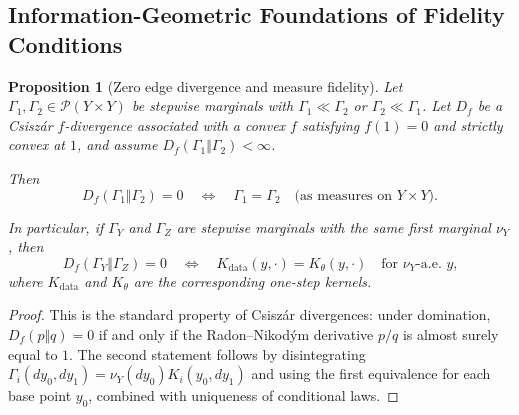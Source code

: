 \documentclass[11pt]{article}
\newtheorem{proposition}{Proposition}
\newcommand{\1}{\mathbf{1}}
\begin{document}

\subsection{Information-Geometric Foundations of Fidelity Conditions}
\label{sec:alpha-stances}

\begin{proposition}[Zero edge divergence and measure fidelity]
\label{prop:zero-div-measure-fidelity}
Let $\Gamma_1, \Gamma_2 \in \mathcal{P}(Y \times Y)$ be stepwise marginals with $\Gamma_1 \ll \Gamma_2$ or $\Gamma_2 \ll \Gamma_1$. Let $D_f$ be a Csisz\'ar $f$-divergence associated with a convex $f$ satisfying $f(1)=0$ and strictly convex at $1$, and assume $D_f(\Gamma_1 \Vert \Gamma_2) < \infty$.

Then
\[
  D_f(\Gamma_1 \Vert \Gamma_2) = 0
  \quad\Longleftrightarrow\quad
  \Gamma_1 = \Gamma_2 \quad \text{(as measures on $Y\times Y$)}.
\]

In particular, if $\Gamma_Y$ and $\Gamma_Z$ are stepwise marginals with the same first marginal $\nu_Y$, then
\[
  D_f(\Gamma_Y \Vert \Gamma_Z) = 0
  \quad\Longleftrightarrow\quad
  K_{\mathrm{data}}(y,\cdot) = K_\theta(y,\cdot)
  \quad \text{for $\nu_Y$-a.e.\ $y$,}
\]
where $K_{\mathrm{data}}$ and $K_\theta$ are the corresponding one-step kernels.
\end{proposition}

\begin{proof}
This is the standard property of Csisz\'ar divergences: under domination, $D_f(p\Vert q) = 0$ if and only if the Radon--Nikod\'ym derivative $p/q$ is almost surely equal to $1$. The second statement follows by disintegrating $\Gamma_i(dy_0,dy_1) = \nu_Y(dy_0) K_i(y_0,dy_1)$ and using the first equivalence for each base point $y_0$, combined with uniqueness of conditional laws.
\end{proof}

\end{document}
